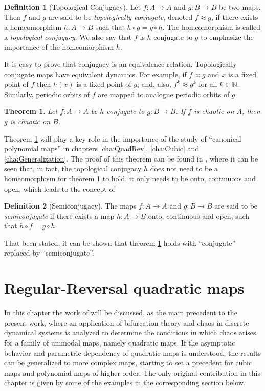 \documentclass[10pt,twoside,titlepage]{book}
\numberwithin{equation}{chapter}
\numberwithin{figure}{chapter}
\numberwithin{table}{chapter}
\theoremstyle{plain}%
\newtheorem{thm}{Theorem}[chapter]
\theoremstyle{definition}
\newtheorem{defn}{Definition}[chapter]
\theoremstyle{remark}
\begin{document}
\begin{defn}[Topological Conjugacy]
	Let $f:A\rightarrow A$ and $g:B\rightarrow B$ be two maps. Then $f$ and $g$ are said to be \emph{topologically conjugate}, denoted $f\approx g$, if there exists a homeomorphism $h:A\rightarrow B$ such that $h\circ g=g\circ h$. The homeomorphism is called a \emph{topological conjugacy}. We also say that $f$ is $h$-conjugate to $g$ to emphasize the importance of the homeomorphism $h$.
\end{defn}

It is easy to prove that conjugacy is an equivalence relation. Topologically conjugate maps have equivalent dynamics. For example, if $f\approx g$ and $x$ is a fixed point of $f$ then $h(x)$ is a fixed point of $g$; and, also, $f^k \approx g^k$ for all $k\in\mathbb{N}$. Similarly, periodic orbits of $f$ are mapped to analogue periodic orbits of $g$.

\begin{thm}
	\label{thm:Conjugacy}
	Let $f:A\rightarrow A$ be $h$-conjugate to $g:B\rightarrow B$. If $f$ is chaotic on $A$, then $g$ is chaotic on $B$.
\end{thm}

Theorem \ref{thm:Conjugacy} will play a key role in the importance of the study of ``canonical polynomial maps'' in chapters \ref{cha:QuadRev}, \ref{cha:Cubic} and \ref{cha:Generalization}. The proof of this theorem can be found in \cite{Elaydi}, where it can be seen that, in fact, the topological conjugacy $h$ does not need to be a homeomorphism for theorem \ref{thm:Conjugacy} to hold, it only needs to be onto, continuous and open, which leads to the concept of

\begin{defn}[Semiconjugacy]
	The maps $f:A\rightarrow A$ and $g:B\rightarrow B$ are said to be \emph{semiconjugate} if there exists a map $h:A\rightarrow B$ onto, continuous and open, such that $h\circ f= g\circ h$.
\end{defn}

That been stated, it can be shown that theorem \ref{thm:Conjugacy} holds with ``conjugate'' replaced by ``semiconjugate''.


\chapter{Regular-Reversal quadratic maps}
\label{cha:Quadratic}

In this chapter the work of \cite{Solis2004} will be discussed, as the main precedent to the present work, where an application of bifurcation theory and chaos in discrete dynamical systems is analyzed to determine the conditions in which chaos arises for a family of unimodal maps, namely quadratic maps. If the asymptotic behavior and parametric dependency of quadratic maps is understood, the results can be generalized to more complex maps, starting to set a precedent for cubic maps and polynomial maps of higher order. The only original contribution in this chapter is given by some of the examples in the corresponding section below.
\end{document}
